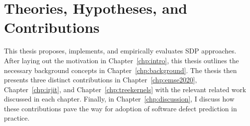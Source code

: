 \documentclass[\main/thesis.tex]{subfiles}
\begin{document}











\section{Theories, Hypotheses, and Contributions}
This thesis proposes, implements, and empirically evaluates SDP approaches. After laying out the motivation in Chapter~\ref{chp:intro}, this thesis
outlines the necessary background concepts in Chapter~\ref{chp:background}. The thesis then presents three distinct contributions in Chapter~\ref{chp:emse2020}, Chapter~\ref{chp:irjit}, and Chapter~\ref{chp:treekernels} with the relevant related work discussed in each chapter. Finally, in Chapter~\ref{chp:discussion}, I discuss how these contributions pave the way for adoption of software defect prediction in practice. \\
\end{document}
